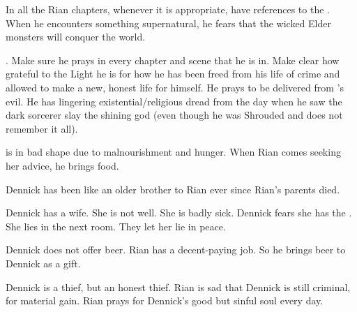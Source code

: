 \begin{changes}
    In all the Rian chapters, whenever it is appropriate, have references to the . 
    When he encounters something supernatural, he fears that the wicked Elder monsters will conquer the world. 
    
    .
    Make sure he prays in every chapter and scene that he is in.
    Make clear how grateful to the Light he is for how he has been freed from his life of crime and allowed to make a new, honest life for himself.
    He prays to be delivered from \Isphet's evil. 
    He has lingering existential/religious dread from the day when he saw the dark sorcerer slay the shining god (even though he was Shrouded and does not remember it all). 
    
    \Uswa is in bad shape due to malnourishment and hunger.
    When Rian comes seeking her advice, he brings food.
    
    Dennick has been like an older brother to Rian ever since Rian's parents died. 
    
    Dennick has a wife. 
    She is not well.
    She is badly sick.
    Dennick fears she has the . 
    She lies in the next room.
    They let her lie in peace.
    
    Dennick does not offer beer. 
    Rian has a decent-paying job.
    So he brings beer to Dennick as a gift. 
    
    Dennick is a thief, but an honest thief. 
    Rian is sad that Dennick is still criminal,  for material gain.
    Rian prays for Dennick's good but sinful soul every day. 
\end{changes}









